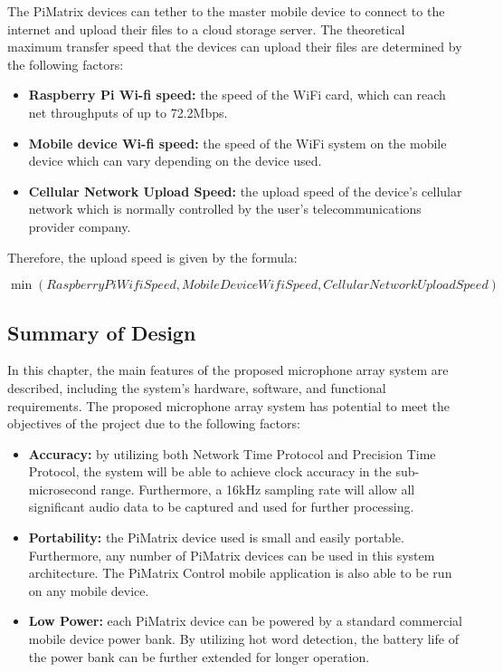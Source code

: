 \documentclass[hidelinks,12pt]{report} %
\begin{document}
The PiMatrix devices can tether to the master mobile device to connect to the internet and upload their files to a cloud storage server. The theoretical maximum transfer speed that the devices can upload their files are determined by the following factors:

	\begin{itemize}
		\item{\textbf{Raspberry Pi Wi-fi speed: }}
		the speed of the WiFi card, which can reach net throughputs of up to 72.2Mbps\cite{30}.
	
		\item{\textbf{Mobile device Wi-fi speed: }}
		the speed of the WiFi system on the mobile device which can vary depending on the device used.

		\item{\textbf{Cellular Network Upload Speed: }}
		the upload speed of the device’s cellular network which is normally controlled by the user’s telecommunications provider company. 
	
		
	\end{itemize}

Therefore, the upload speed is given by the formula:

\begin{equation} \label{eq:1}
    \min{(RaspberryPiWifiSpeed, MobileDeviceWifiSpeed, CellularNetworkUploadSpeed)}
\end{equation}


\subsection{Summary of Design}

In this chapter, the main features of the proposed microphone array system are described, including the system’s hardware, software, and functional requirements. The proposed microphone array system has potential to meet the objectives of the project due to the following factors:

	\begin{itemize}
		\item{\textbf{Accuracy: }}
		by utilizing both Network Time Protocol and Precision Time Protocol, the system will be able to achieve clock accuracy in the sub-microsecond range. Furthermore, a 16kHz sampling rate will allow all significant audio data to be captured and used for further processing. 
	
		\item{\textbf{Portability: }}
		the PiMatrix device used is small and easily portable. Furthermore, any number of PiMatrix devices can be used in this system architecture. The PiMatrix Control mobile application is also able to be run on any mobile device.

		\item{\textbf{Low Power: }}
		each PiMatrix device can be powered by a standard commercial mobile device power bank. By utilizing hot word detection, the battery life of the power bank can be further extended for longer operation.
	
		
	\end{itemize}
\end{document}
